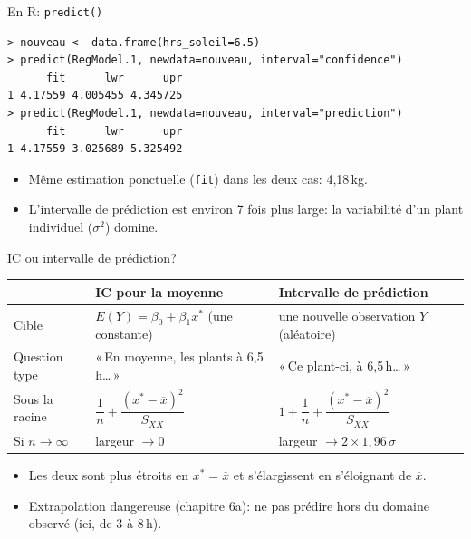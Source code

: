 \documentclass{BeamerTemplate}
\begin{document}
\begin{frame}[fragile,t]{En R: \texttt{predict()}}

\begin{Verbatim}[fontsize=\small]
> nouveau <- data.frame(hrs_soleil=6.5)
> predict(RegModel.1, newdata=nouveau, interval="confidence")
      fit      lwr      upr
1 4.17559 4.005455 4.345725
> predict(RegModel.1, newdata=nouveau, interval="prediction")
      fit      lwr      upr
1 4.17559 3.025689 5.325492
\end{Verbatim}

\begin{itemize}\itemsep2mm
  \item Même estimation ponctuelle (\texttt{fit}) dans les deux cas: 4,18\,kg.
  \item L'intervalle de prédiction est environ \alert{7 fois plus large}: la
  variabilité d'un plant individuel ($\sigma^2$) domine.
\end{itemize}

\end{frame}

\begin{frame}[t]{IC ou intervalle de prédiction?}

\begin{center}
\small
\renewcommand{\arraystretch}{1.4}
\begin{tabular}{@{}l>{\raggedright\arraybackslash}p{4.4cm}>{\raggedright\arraybackslash}p{4.4cm}@{}}
\toprule
& \textbf{IC pour la moyenne} & \textbf{Intervalle de prédiction}\\
\midrule
Cible & $E(Y)=\beta_0+\beta_1x^*$ (une constante) & une \alert{nouvelle} observation $Y$
(aléatoire)\\
Question type & «\,En moyenne, les plants à 6,5\,h\ldots\,» & «\,Ce plant-ci, à
6,5\,h\ldots\,»\\
Sous la racine & $\dfrac1n+\dfrac{(x^*-\overline{x})^2}{S_{XX}}$ &
$1+\dfrac1n+\dfrac{(x^*-\overline{x})^2}{S_{XX}}$\\
Si $n\to\infty$ & largeur $\to0$ & largeur $\to2\times1{,}96\,\sigma$\\
\bottomrule
\end{tabular}
\end{center}

\begin{itemize}\itemsep2mm
  \item<2-> Les deux sont plus étroits en $x^*=\overline{x}$ et s'élargissent en
  s'éloignant de $\overline{x}$.
  \item<3-> \alert{Extrapolation dangereuse} (chapitre 6a): ne pas prédire hors du
  domaine observé (ici, de 3 à 8\,h).
\end{itemize}

\end{frame}
\end{document}
